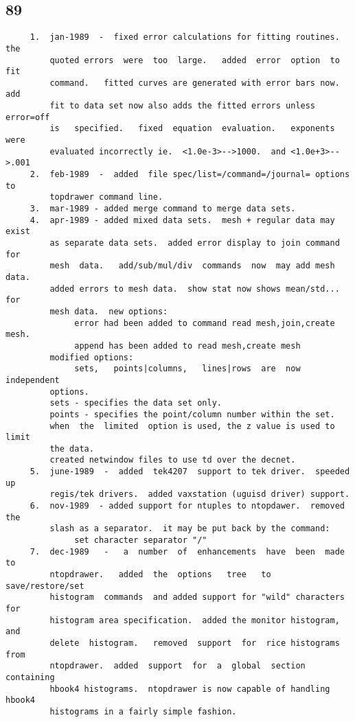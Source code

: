 \subsection{89}
\begin{verbatim}
     1.  jan-1989  -  fixed error calculations for fitting routines.  the
         quoted errors  were  too  large.   added  error  option  to  fit
         command.   fitted curves are generated with error bars now.  add
         fit to data set now also adds the fitted errors unless error=off
         is   specified.   fixed  equation  evaluation.   exponents  were
         evaluated incorrectly ie.  <1.0e-3>-->1000.  and <1.0e+3>-->.001 
     2.  feb-1989  -  added  file spec/list=/command=/journal= options to
         topdrawer command line.  
     3.  mar-1989 - added merge command to merge data sets.  
     4.  apr-1989 - added mixed data sets.  mesh + regular data may exist
         as separate data sets.  added error display to join command  for
         mesh  data.   add/sub/mul/div  commands  now  may add mesh data.
         added errors to mesh data.  show stat now shows mean/std...  for
         mesh data.  new options:  
              error had been added to command read mesh,join,create mesh. 
              append has been added to read mesh,create mesh 
         modified options:  
              sets,   points|columns,   lines|rows  are  now  independent
         options.  
         sets - specifies the data set only.  
         points - specifies the point/column number within the set.  
         when  the  limited  option is used, the z value is used to limit
         the data.  
         created netwindow files to use td over the decnet.  
     5.  june-1989  -  added  tek4207  support to tek driver.  speeded up
         regis/tek drivers.  added vaxstation (uguisd driver) support.  
     6.  nov-1989  - added support for ntuples to ntopdawer.  removed the
         slash as a separator.  it may be put back by the command:  
              set character separator "/" 
     7.  dec-1989   -   a  number  of  enhancements  have  been  made  to
         ntopdrawer.   added  the  options   tree   to   save/restore/set
         histogram  commands  and added support for "wild" characters for
         histogram area specification.  added the monitor histogram,  and
         delete  histogram.   removed  support  for  rice histograms from
         ntopdrawer.  added  support  for  a  global  section  containing
         hbook4 histograms.  ntopdrawer is now capable of handling hbook4
         histograms in a fairly simple fashion.  
\end{verbatim}

